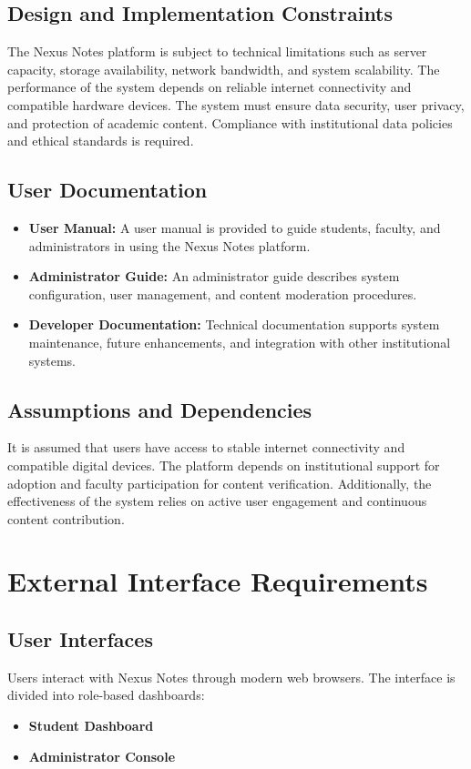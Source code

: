 \documentclass[12pt]{article}
\begin{document}
\subsection{Design and Implementation Constraints}
The Nexus Notes platform is subject to technical limitations such as server capacity, storage availability, network bandwidth, and system scalability.
The performance of the system depends on reliable internet connectivity and compatible hardware devices.
The system must ensure data security, user privacy, and protection of academic content.
Compliance with institutional data policies and ethical standards is required.

\subsection{User Documentation}
\begin{itemize}
    \item \textbf{User Manual:} A user manual is provided to guide students, faculty, and administrators in using the Nexus Notes platform.
    \item \textbf{Administrator Guide:} An administrator guide describes system configuration, user management, and content moderation procedures.
    \item \textbf{Developer Documentation:} Technical documentation supports system maintenance, future enhancements, and integration with other institutional systems.
\end{itemize}

\subsection{Assumptions and Dependencies}
It is assumed that users have access to stable internet connectivity and compatible digital devices.
The platform depends on institutional support for adoption and faculty participation for content verification.
Additionally, the effectiveness of the system relies on active user engagement and continuous content contribution.

\section{External Interface Requirements}

\subsection{User Interfaces}
Users interact with Nexus Notes through modern web browsers.
The interface is divided into role-based dashboards:
\begin{itemize}
    \item \textbf{Student Dashboard}
    \item \textbf{Administrator Console}
\end{itemize}
\end{document}
